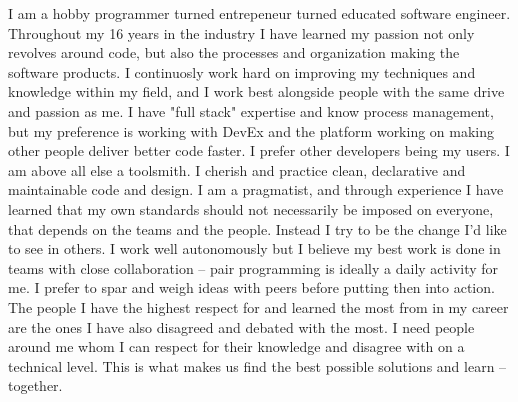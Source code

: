 

I am a hobby programmer turned entrepeneur turned educated software engineer. Throughout my 16 years in the industry I have learned my passion not only revolves around code, but also the processes and organization making the software products.
\newline\newline
I continuosly work hard on improving my techniques and knowledge within my field, and I work best alongside people with the same drive and passion as me.
\newline\newline
I have "full stack" expertise and know process management, but my preference is working with DevEx and the platform working on making other people deliver better code faster. I prefer other developers being my users.
I am above all else a toolsmith.
\newline\newline
I cherish and practice clean, declarative and maintainable code and design. I am a pragmatist, and through experience I have learned that my own standards should not necessarily be imposed on everyone, that depends on the teams and the people. Instead I try to be the change I'd like to see in others.
\newline\newline
I work well autonomously but I believe my best work is done in teams with close collaboration -- pair programming is ideally a daily activity for me. I prefer to spar and weigh ideas with peers before putting then into action. The people I have the highest respect for and learned the most from in my career are the ones I have also disagreed and debated with the most.
I need people around me whom I can respect for their knowledge and disagree with on a technical level. This is what makes us find the best possible solutions and learn -- together.
